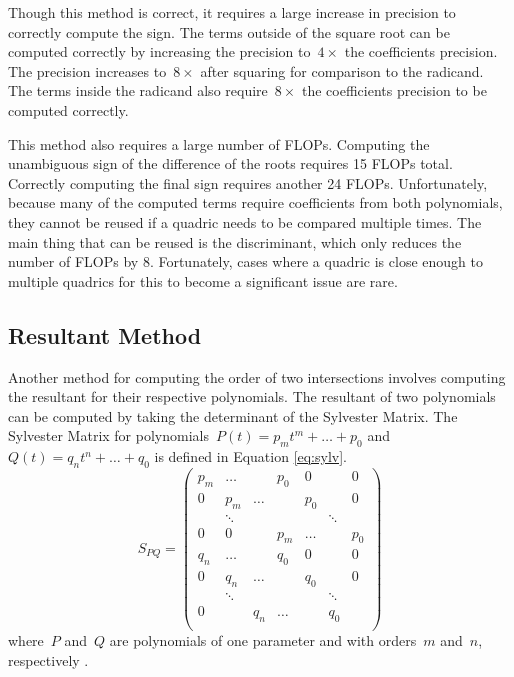 \documentclass{cccg16}
\begin{document}
Though this method is correct, it requires a large increase in
precision to correctly compute the sign. The terms outside of the
square root can be computed correctly by increasing the precision
to~$4\times$ the coefficients precision.  The precision increases
to~$8\times$ after squaring for comparison to the radicand.  The terms
inside the radicand also require~$8\times$ the coefficients precision
to be computed correctly.

This method also requires a large number of FLOPs.  Computing the
unambiguous sign of the difference of the roots requires 15 FLOPs
total.  Correctly computing the final sign requires another 24 FLOPs.
Unfortunately, because many of the computed terms require coefficients
from both polynomials, they cannot be reused if a quadric needs to be
compared multiple times.  The main thing that can be reused is the
discriminant, which only reduces the number of FLOPs by 8.
Fortunately, cases where a quadric is close enough to multiple
quadrics for this to become a significant issue are rare.

\subsection{Resultant Method}
Another method for computing the order of two intersections involves
computing the resultant for their respective polynomials.  The
resultant of two polynomials can be computed by taking the determinant
of the Sylvester Matrix.  The Sylvester Matrix for
polynomials~$P(t)=p_m t^m + \dots + p_0$ and~$Q(t)=q_n t^n + \dots +
q_0$ is defined in Equation \ref{eq:sylv}.
\begin{equation}
  S_{PQ}=\begin{pmatrix}
    p_m & \dots & & p_0 & 0 & & 0\\
    0 & p_m & \dots & & p_0 & & 0\\
    & \ddots & & & & \ddots\\
    0 & 0 & & p_m & \dots & & p_0\\
    q_n & \dots & & q_0 & 0 & & 0\\
    0 & q_n & \dots & & q_0 & & 0\\
    & \ddots & & & & \ddots\\
    0 & & q_n & \dots & & q_0\\
  \end{pmatrix}
  \label{eq:sylv}
\end{equation}
where~$P$ and~$Q$ are polynomials of one parameter and with orders~$m$
and~$n$, respectively \cite[Section~3.5]{cheeyap}.
\end{document}
